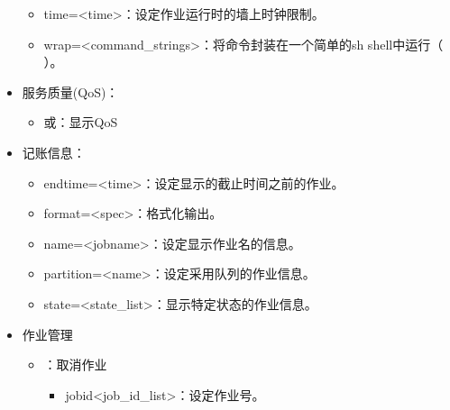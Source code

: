 \documentclass[a4paper,12pt,english]{sphinxmanual}
\begin{document}
\begin{itemize}
\begin{itemize}
\item {} 
\sphinxAtStartPar
\sphinxhyphen{}\sphinxhyphen{}time=<time>：设定作业运行时的墙上时钟限制。

\item {} 
\sphinxAtStartPar
\sphinxhyphen{}\sphinxhyphen{}wrap=<command\_strings>：将命令封装在一个简单的sh shell中运行（  ）。

\end{itemize}

\item {} 
\sphinxAtStartPar
服务质量(QoS)：
\begin{itemize}
\item {} 
\sphinxAtStartPar
{}或：显示QoS

\end{itemize}

\item {} 
\sphinxAtStartPar
记账信息：
\begin{itemize}
\item {} 
\sphinxAtStartPar
\sphinxhyphen{}\sphinxhyphen{}endtime=<time>：设定显示的截止时间之前的作业。

\item {} 
\sphinxAtStartPar
\sphinxhyphen{}\sphinxhyphen{}format=<spec>：格式化输出。

\item {} 
\sphinxAtStartPar
\sphinxhyphen{}\sphinxhyphen{}name=<jobname>：设定显示作业名的信息。

\item {} 
\sphinxAtStartPar
\sphinxhyphen{}\sphinxhyphen{}partition=<name>：设定采用队列的作业信息。

\item {} 
\sphinxAtStartPar
\sphinxhyphen{}\sphinxhyphen{}state=<state\_list>：显示特定状态的作业信息。

\end{itemize}

\item {} 
\sphinxAtStartPar
作业管理
\begin{itemize}
\item {} 
\sphinxAtStartPar
{}：取消作业
\begin{itemize}
\item {} 
\sphinxAtStartPar
jobid<job\_id\_list>：设定作业号。


\end{itemize}
\end{itemize}
\end{itemize}
\end{document}
